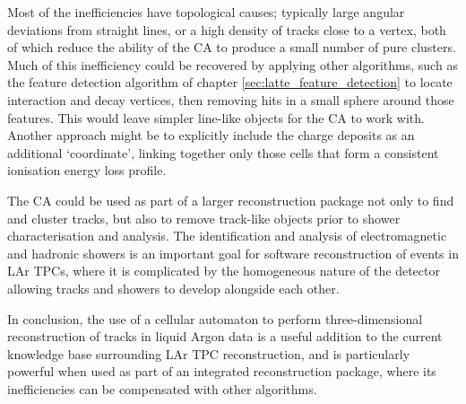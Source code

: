 Most of the inefficiencies have topological causes; typically large angular deviations from straight lines, or a high density of tracks close to a vertex, both of which reduce the ability of the CA to produce a small number of pure clusters. Much of this inefficiency could be recovered by applying other algorithms, such as the feature detection algorithm of chapter \ref{sec:latte_feature_detection} to locate interaction and decay vertices, then removing hits in a small sphere around those features. This would leave simpler line-like objects for the CA to work with. Another approach might be to explicitly include the charge deposits as an additional `coordinate', linking together only those cells that form a consistent ionisation energy loss profile.

The CA could be used as part of a larger reconstruction package not only to find and cluster tracks, but also to remove track-like objects prior to shower characterisation and analysis. The identification and analysis of electromagnetic and hadronic showers is an important goal for software reconstruction of events in LAr TPCs, where it is complicated by the homogeneous nature of the detector allowing tracks and showers to develop alongside each other.

In conclusion, the use of a cellular automaton to perform three-dimensional reconstruction of tracks in liquid Argon data is a useful addition to the current knowledge base surrounding \ac{LAr TPC} reconstruction, and is particularly powerful when used as part of an integrated reconstruction package, where its inefficiencies can be compensated with other algorithms.
